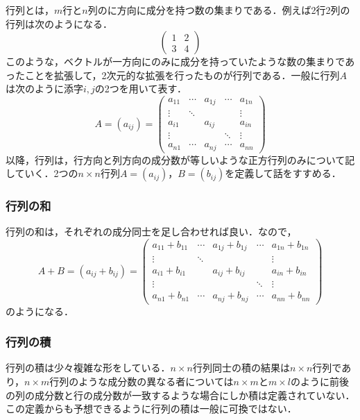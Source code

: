 \documentclass[dvipdfmx,a4]{jsarticle}
\begin{document}
行列とは，\(m\)行と\(n\)列のに方向に成分を持つ数の集まりである．例えば2行2列の行列は次のようになる．
\begin{equation*}
  \begin{pmatrix}
    1 & 2 \\
    3 & 4
  \end{pmatrix}
\end{equation*}
このような，ベクトルが一方向にのみに成分を持っていたような数の集まりであったことを拡張して，2次元的な拡張を行ったものが行列である．一般に行列\(A\)は次のように添字\(i,j\)の2つを用いて表す．
\begin{equation*}
  A= (a_{ij})=
  \begin{pmatrix}
    a_{11} & \cdots & a_{1j} & \cdots & a_{1n} \\
    \vdots & \ddots &        &        & \vdots \\
    a_{i1} &        & a_{ij} &        & a_{in} \\
    \vdots &        &        & \ddots & \vdots \\
    a_{n1} & \cdots & a_{nj} & \cdots & a_{nn}
  \end{pmatrix}
\end{equation*}
以降，行列は，行方向と列方向の成分数が等しいような正方行列のみについて記していく．2つの\(n\times n\)行列\(A=(a_{ij})\)，\(B=(b_{ij})\)を定義して話をすすめる．
\subsubsection{行列の和}
行列の和は，それぞれの成分同士を足し合わせれば良い．なので，
\begin{equation*}
  A+B= (a_{ij}+b_{ij})=
  \begin{pmatrix}
    a_{11} +b_{11} & \cdots & a_{1j}+b_{1j}  & \cdots & a_{1n}+b_{1n} \\
    \vdots         & \ddots &                &        & \vdots        \\
    a_{i1} +b_{i1} &        & a_{ij} +b_{ij} &        & a_{in}+b_{in} \\
    \vdots         &        &                & \ddots & \vdots        \\
    a_{n1} +b_{n1} & \cdots & a_{nj} +b_{nj} & \cdots & a_{nn}+b_{nn}
  \end{pmatrix}
\end{equation*}
のようになる．

\subsubsection{行列の積}
行列の積は少々複雑な形をしている．\(n\times n\)行列同士の積の結果は\(n\times n\)行列であり，\(n\times m\)行列のような成分数の異なる者については\(n\times m\)と\(m\times l\)のように前後の列の成分数と行の成分数が一致するような場合にしか積は定義されていない．この定義からも予想できるように行列の積は一般に可換ではない．
\end{document}
